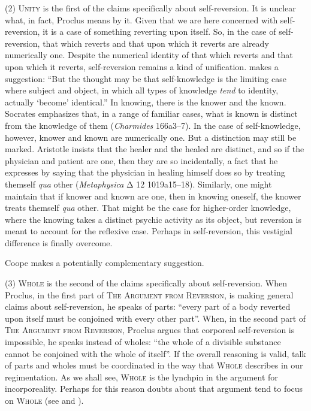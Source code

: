 (2) \textsc{Unity} is the first of the claims specifically about self-reversion. It is unclear what, in fact, Proclus means by it. Given that we are here concerned with self-reversion, it is a case of something reverting upon itself. So, in the case of self-reversion, that which reverts and that upon which it reverts are already numerically one. Despite the numerical identity of that which reverts and that upon which it reverts, self-reversion remains a kind of unification. \citet[203]{Dodds:1963ul} makes a suggestion: ``But the thought may be that self-knowledge is the limiting case where subject and object, in which all types of knowledge \emph{tend} to identity, actually `become' identical.'' In knowing, there is the knower and the known. Socrates emphasizes that, in a range of familiar cases, what is known is distinct from the knowledge of them (\emph{Charmides} 166a3–7). In the case of self-knowledge, however, knower and known are numerically one. But a distinction may still be marked. Aristotle insists that the healer and the healed are distinct, and so if the physician and patient are one, then they are so incidentally, a fact that he expresses by saying that the physician in healing himself does so by treating themself \emph{qua} other (\emph{Metaphysica} {\sbl Δ} 12 1019a15–18). Similarly, one might maintain that if knower and known are one, then in knowing oneself, the knower treats themself \emph{qua} other. That might be the case for higher-order knowledge, where the knowing takes a distinct psychic activity as its object, but reversion is meant to account for the reflexive case. Perhaps in self-reversion, this vestigial difference is finally overcome.

Coope makes a potentially complementary suggestion.

(3) \textsc{Whole} is the second of the claims specifically about self-reversion. When Proclus, in the first part of \textsc{The Argument from Reversion}, is making general claims about self-reversion, he speaks of parts: ``every part of a body reverted upon itself must be conjoined with every other part''. When, in the second part of \textsc{The Argument from Reversion}, Proclus argues that corporeal self-reversion is impossible, he speaks instead of wholes: ``the whole of a divisible substance cannot be conjoined with the whole of itself''. If the overall reasoning is valid, talk of parts and wholes must be coordinated in the way that \textsc{Whole} describes in our regimentation. As we shall see, \textsc{Whole} is the lynchpin in the argument for incorporeality. Perhaps for this reason doubts about that argument tend to focus on \textsc{Whole} (see \citealt[521–2]{Barnes:2011kv} and \citealt[chapter 7.4]{Coope:2020aa}). 


